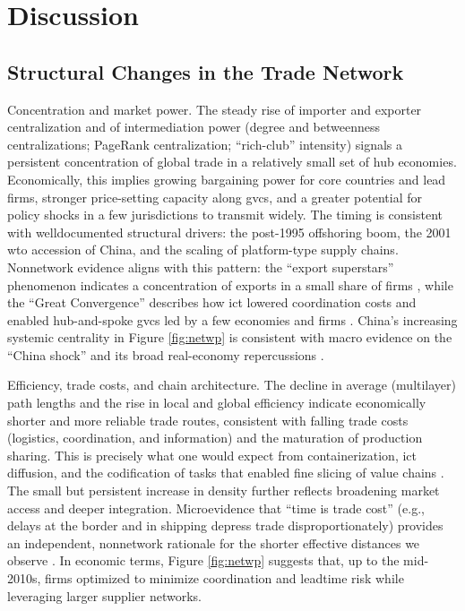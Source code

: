 \documentclass[preprint, 3p,
authoryear]{elsarticle} %
\begin{document}
\section{Discussion}\label{discussion}

\subsection{Structural Changes in the Trade
Network}\label{structural-changes-in-the-trade-network}

Concentration and market power. The steady rise of importer and exporter
centralization and of intermediation power (degree and betweenness
centralizations; PageRank centralization; ``rich-club'' intensity)
signals a persistent concentration of global trade in a relatively small
set of hub economies. Economically, this implies growing bargaining
power for core countries and lead firms, stronger price-setting capacity
along \glspl{gvc}, and a greater potential for policy shocks in a few
jurisdictions to transmit widely. The timing is consistent with
welldocumented structural drivers: the post-1995 offshoring boom, the
2001 \gls{wto} accession of China, and the scaling of platform-type
supply chains. Nonnetwork evidence aligns with this pattern: the
``export superstars'' phenomenon indicates a concentration of exports in
a small share of firms \citep{freund2015export, rowley2024domestic},
while the ``Great Convergence'' describes how \gls{ict} lowered
coordination costs and enabled hub-and-spoke \glspl{gvc} led by a few
economies and firms \citep{baldwin2016great}. China's increasing
systemic centrality in Figure \ref{fig:netwp} is consistent with macro
evidence on the ``China shock'' and its broad real-economy repercussions
\citep{autor2016china, dorn2024labour}.

Efficiency, trade costs, and chain architecture. The decline in average
(multilayer) path lengths and the rise in local and global efficiency
indicate economically shorter and more reliable trade routes, consistent
with falling trade costs (logistics, coordination, and information) and
the maturation of production sharing. This is precisely what one would
expect from containerization, \gls{ict} diffusion, and the codification
of tasks that enabled fine slicing of value chains
\citep{hummels2001nature, ren2024regional, baldwin2016great}. The small
but persistent increase in density further reflects broadening market
access and deeper integration. Microevidence that ``time is trade cost''
(e.g., delays at the border and in shipping depress trade
disproportionately) provides an independent, nonnetwork rationale for
the shorter effective distances we observe \citep{liu2013investigating}.
In economic terms, Figure \ref{fig:netwp} suggests that, up to the
mid-2010s, firms optimized to minimize coordination and leadtime risk
while leveraging larger supplier networks.
\end{document}
